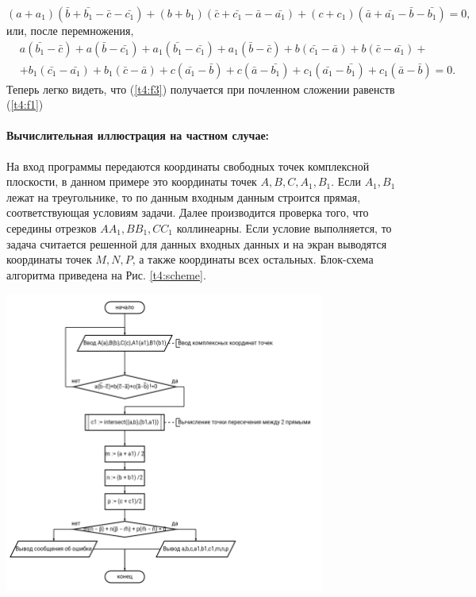 {   \(
   (a+a_1)(\bar{b}+\bar{b_1}-\bar{c}-\bar{c_1})+(b+b_1 )(\bar{c}+\bar{c_1}-\bar{a}-\bar{a_1})+(c+c_1)(\bar{a}+\bar{a_1}-\bar{b}-\bar{b_1})=0,
   \) или, после перемножения,
   \begin{equation}
      \begin{aligned}
          & a(\bar{b_1} - \bar{c}) + a(\bar{b}- \bar{c_1}) + a_1(\bar{b_1} - \bar{c_1}) + a_1(\bar{b}- \bar{c}) + b(\bar{c_1} - \bar{a}) + b(\bar{c}- \bar{a_1}) + \\
          & +b_1(\bar{c_1}-\bar{a_1})+b_1 (\bar{c}-\bar{a})+c(\bar{a_1}-\bar{b})+c(\bar{a}-\bar{b_1})+c_1 (\bar{a_1}-\bar{b_1} )+c_1(\bar{a}-\bar{b})=0.
      \end{aligned}
      \label{t4:f3}
   \end{equation}
   Теперь легко видеть, что (\ref{t4:f3}) получается при почленном сложении
   равенств (\ref{t4:f1})
   \paragraph{Вычислительная иллюстрация на частном случае:} На вход программы передаются координаты
   свободных точек комплексной плоскости, в данном примере это координаты точек \(A,B,C,A_1,B_1\). Если \(A_1,B_1\)
   лежат на треугольнике, то по данным входным данным строится прямая, соответствующая условиям задачи. Далее
   производится проверка того, что середины отрезков \(AA_1,BB_1,CC_1\) коллинеарны. Если условие выполняется, то задача
   считается решенной для данных входных данных и на экран выводятся координаты точек \(M,N,P\), а также координаты
   всех остальных. Блок-схема алгоритма приведена на Рис. \ref{t4:scheme}.
   \begin{center}
      \includegraphics[width=0.79\textwidth]{images/task4-diagram.png}
      \label{t4:scheme}
   \end{center}

}
